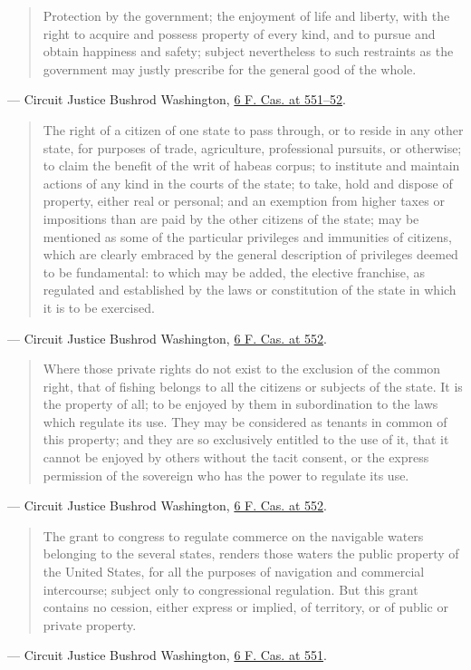 \documentclass[12pt]{article}
\begin{document}
\begin{quote}
Protection by the government; the enjoyment of life and liberty, with the right to acquire and possess property of every kind, and to pursue and obtain happiness and safety; subject nevertheless to such restraints as the government may justly prescribe for the general good of the whole.
\end{quote}
\noindent --- Circuit Justice Bushrod Washington, \href{https://press-pubs.uchicago.edu/founders/documents/a4_2_1s18.html}{6 F. Cas. at 551--52}.

\begin{quote}
The right of a citizen of one state to pass through, or to reside in any other state, for purposes of trade, agriculture, professional pursuits, or otherwise; to claim the benefit of the writ of habeas corpus; to institute and maintain actions of any kind in the courts of the state; to take, hold and dispose of property, either real or personal; and an exemption from higher taxes or impositions than are paid by the other citizens of the state; may be mentioned as some of the particular privileges and immunities of citizens, which are clearly embraced by the general description of privileges deemed to be fundamental: to which may be added, the elective franchise, as regulated and established by the laws or constitution of the state in which it is to be exercised.
\end{quote}
\noindent --- Circuit Justice Bushrod Washington, \href{https://press-pubs.uchicago.edu/founders/documents/a4_2_1s18.html}{6 F. Cas. at 552}.

\begin{quote}
Where those private rights do not exist to the exclusion of the common right, that of fishing belongs to all the citizens or subjects of the state. It is the property of all; to be enjoyed by them in subordination to the laws which regulate its use. They may be considered as tenants in common of this property; and they are so exclusively entitled to the use of it, that it cannot be enjoyed by others without the tacit consent, or the express permission of the sovereign who has the power to regulate its use.
\end{quote}
\noindent --- Circuit Justice Bushrod Washington, \href{https://press-pubs.uchicago.edu/founders/documents/a4_2_1s18.html}{6 F. Cas. at 552}.

\begin{quote}
The grant to congress to regulate commerce on the navigable waters belonging to the several states, renders those waters the public property of the United States, for all the purposes of navigation and commercial intercourse; subject only to congressional regulation. But this grant contains no cession, either express or implied, of territory, or of public or private property.
\end{quote}
\noindent --- Circuit Justice Bushrod Washington, \href{https://press-pubs.uchicago.edu/founders/documents/a4_2_1s18.html}{6 F. Cas. at 551}.
\end{document}
